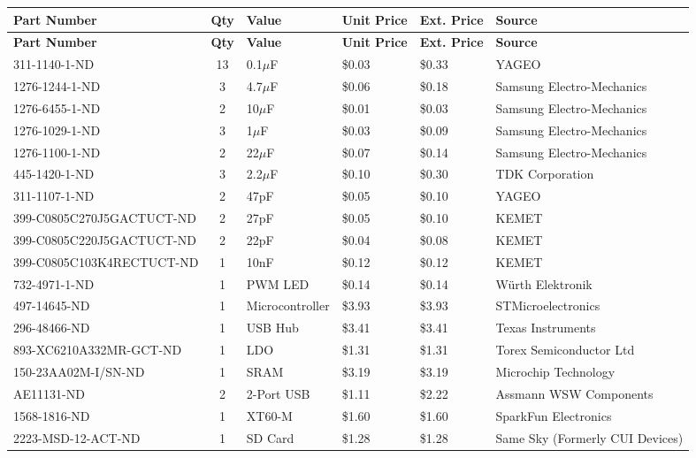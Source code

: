 \documentclass[../main.tex]{subfiles}
\begin{document}
\small
\setlength{\tabcolsep}{2pt}

\begin{longtable}{|p{5cm}|c|p{3cm}|p{1.2cm}|p{1.2cm}|p{5cm}|}
\hline
\textbf{Part Number} & \textbf{Qty} & \textbf{Value} & \textbf{Unit Price} & \textbf{Ext. Price} & \textbf{Source} \\
\hline
\endfirsthead
\hline
\textbf{Part Number} & \textbf{Qty} & \textbf{Value} & \textbf{Unit Price} & \textbf{Ext. Price} & \textbf{Source} \\
\hline
\endhead

311-1140-1-ND & 13 & 0.1$\mu$F & \$0.03 & \$0.33 & YAGEO \\
1276-1244-1-ND & 3 & 4.7$\mu$F & \$0.06 & \$0.18 & Samsung Electro-Mechanics \\
1276-6455-1-ND & 2 & 10$\mu$F & \$0.01 & \$0.03 & Samsung Electro-Mechanics \\
1276-1029-1-ND & 3 & 1$\mu$F & \$0.03 & \$0.09 & Samsung Electro-Mechanics \\
1276-1100-1-ND & 2 & 22$\mu$F & \$0.07 & \$0.14 & Samsung Electro-Mechanics \\
445-1420-1-ND & 3 & 2.2$\mu$F & \$0.10 & \$0.30 & TDK Corporation \\
311-1107-1-ND & 2 & 47pF & \$0.05 & \$0.10 & YAGEO \\
399-C0805C270J5GACTUCT-ND & 2 & 27pF & \$0.05 & \$0.10 & KEMET \\
399-C0805C220J5GACTUCT-ND & 2 & 22pF & \$0.04 & \$0.08 & KEMET \\
399-C0805C103K4RECTUCT-ND & 1 & 10nF & \$0.12 & \$0.12 & KEMET \\
732-4971-1-ND & 1 & PWM LED & \$0.14 & \$0.14 & Würth Elektronik \\
497-14645-ND & 1 & Microcontroller & \$3.93 & \$3.93 & STMicroelectronics \\
296-48466-ND & 1 & USB Hub & \$3.41 & \$3.41 & Texas Instruments \\
893-XC6210A332MR-GCT-ND & 1 & LDO & \$1.31 & \$1.31 & Torex Semiconductor Ltd \\
150-23AA02M-I/SN-ND & 1 & SRAM & \$3.19 & \$3.19 & Microchip Technology \\
AE11131-ND & 2 & 2-Port USB & \$1.11 & \$2.22 & Assmann WSW Components \\
1568-1816-ND & 1 & XT60-M & \$1.60 & \$1.60 & SparkFun Electronics \\
2223-MSD-12-ACT-ND & 1 & SD Card & \$1.28 & \$1.28 & Same Sky (Formerly CUI Devices) \\

\end{longtable}
\end{document}
